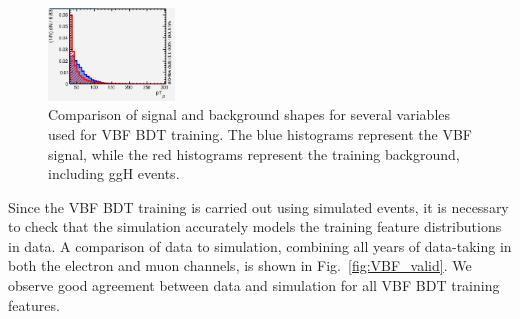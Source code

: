 \begin{figure}[tb]
\begin{center}
		\includegraphics[width=0.3\textwidth]{fig/MVA/ptj2_vbf.png}
	\end{center}
	\caption{Comparison of signal and background shapes for several variables used for VBF BDT training. The blue histograms represent the VBF signal, while the red histograms represent the training background, including ggH \hzg{} events.}
	\label{fig:vbf_bdt_features}
\end{figure}

Since the VBF BDT training is carried out using simulated events, it is necessary to check that the simulation accurately models the training feature distributions in data. 
A comparison of data to simulation, combining all years of data-taking in both the electron and muon channels, is shown in Fig.~\ref{fig:VBF_valid}. We observe good agreement between
data and simulation for all VBF BDT training features. 

